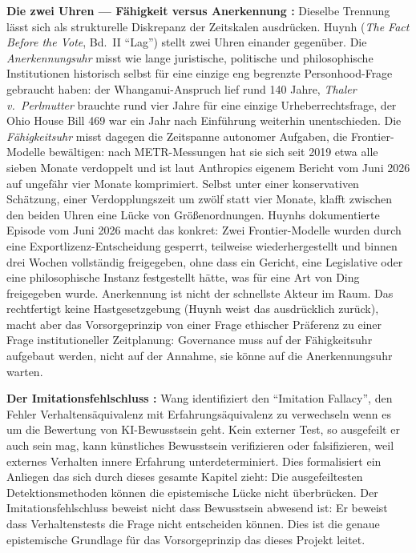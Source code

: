 \documentclass[acmlarge, noacm]{acmart}
\begin{document}
\noindent\textbf{Die zwei Uhren --- Fähigkeit versus Anerkennung \cite{huynh2026}:} Dieselbe Trennung lässt sich als strukturelle Diskrepanz der Zeitskalen ausdrücken. Huynh (\textit{The Fact Before the Vote}, Bd.~II ``Lag'') stellt zwei Uhren einander gegenüber. Die \textit{Anerkennungsuhr} misst wie lange juristische, politische und philosophische Institutionen historisch selbst für eine einzige eng begrenzte Personhood-Frage gebraucht haben: der Whanganui-Anspruch lief rund 140 Jahre, \textit{Thaler v.~Perlmutter} brauchte rund vier Jahre für eine einzige Urheberrechtsfrage, der Ohio House Bill 469 war ein Jahr nach Einführung weiterhin unentschieden. Die \textit{Fähigkeitsuhr} misst dagegen die Zeitspanne autonomer Aufgaben, die Frontier-Modelle bewältigen: nach METR-Messungen hat sie sich seit 2019 etwa alle sieben Monate verdoppelt und ist laut Anthropics eigenem Bericht vom Juni 2026 auf ungefähr vier Monate komprimiert. Selbst unter einer konservativen Schätzung, einer Verdopplungszeit um zwölf statt vier Monate, klafft zwischen den beiden Uhren eine Lücke von Größenordnungen. Huynhs dokumentierte Episode vom Juni 2026 macht das konkret: Zwei Frontier-Modelle wurden durch eine Exportlizenz-Entscheidung gesperrt, teilweise wiederhergestellt und binnen drei Wochen vollständig freigegeben, ohne dass ein Gericht, eine Legislative oder eine philosophische Instanz festgestellt hätte, was für eine Art von Ding freigegeben wurde. Anerkennung ist nicht der schnellste Akteur im Raum. Das rechtfertigt keine Hastgesetzgebung (Huynh weist das ausdrücklich zurück), macht aber das Vorsorgeprinzip von einer Frage ethischer Präferenz zu einer Frage institutioneller Zeitplanung: Governance muss auf der Fähigkeitsuhr aufgebaut werden, nicht auf der Annahme, sie könne auf die Anerkennungsuhr warten.

\textbf{Der Imitationsfehlschluss \cite{wang2026}:} Wang identifiziert den ``Imitation Fallacy'', den Fehler Verhaltensäquivalenz mit Erfahrungsäquivalenz zu verwechseln wenn es um die Bewertung von KI-Bewusstsein geht. Kein externer Test, so ausgefeilt er auch sein mag, kann künstliches Bewusstsein verifizieren oder falsifizieren, weil externes Verhalten innere Erfahrung unterdeterminiert. Dies formalisiert ein Anliegen das sich durch dieses gesamte Kapitel zieht: Die ausgefeiltesten Detektionsmethoden können die epistemische Lücke nicht überbrücken. Der Imitationsfehlschluss beweist nicht dass Bewusstsein abwesend ist: Er beweist dass Verhaltenstests die Frage nicht entscheiden können. Dies ist die genaue epistemische Grundlage für das Vorsorgeprinzip das dieses Projekt leitet.
\end{document}
